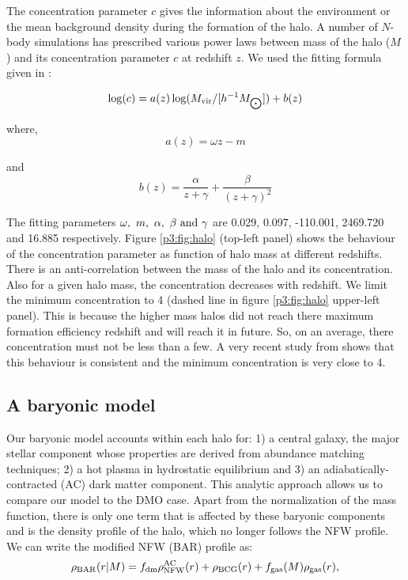 \documentclass[
  11pt,
  twoside,
  openright,
  titlepage,
  headings=optiontoheadandtoc
]{scrbook}
\begin{document}
The concentration parameter $c$ gives the information about the environment or the mean background density during the formation of the halo. A number of $N$-body simulations \citep{1997ApJ...490..493N, 1999MNRAS.310..527A, 2000ApJ...535...30J, 2001MNRAS.321..559B, 2001ApJ...554..114E, 2003ApJ...597L...9Z, 2007MNRAS.381.1450N, 2007MNRAS.378...55M, 2008MNRAS.390L..64D, 2008MNRAS.387..536G, 2014MNRAS.441.3359D} has prescribed various power laws between mass of the halo ($M$) and its concentration parameter $c$ at redshift $z$. We used the fitting formula given in \citep{2011MNRAS.411..584M}:

\begin{equation}
	\log(c) = a(z)\log(M_{\rm vir}/[h^{-1} M_{\bigodot}]) + b(z)
\end{equation}

where,
\begin{equation}
	a(z) = \omega z - m
\end{equation}

and
\begin{equation}
	b(z) = \dfrac{\alpha}{z+\gamma} + \dfrac{\beta}{(z+\gamma)^2}
\end{equation}

The fitting parameters $\omega,\ m,\ \alpha,\ \beta\ {\rm and}\ \gamma$ are 0.029, 0.097, -110.001, 2469.720 and 16.885 respectively.
Figure \ref{p3:fig:halo} (top-left panel) shows the behaviour of the concentration parameter as function of halo mass at different redshifts. There is an anti-correlation between the mass of the halo and its concentration. Also for a given halo mass, the concentration decreases with redshift. We limit the minimum concentration to 4 (dashed line in figure \ref{p3:fig:halo} upper-left panel). This is because the higher mass halos did not reach there maximum formation efficiency redshift and will reach it in future. So, on an average, there concentration must not be less than a few. A very recent study from \cite{2014MNRAS.441.3359D} shows that this behaviour is consistent and the minimum concentration is very close to 4. 


\subsection{A baryonic model}\label{p3:sec:baryonicmodel}
Our baryonic model accounts within each halo for: 1) a central galaxy, the major stellar component whose properties are derived from abundance matching techniques; 2) a hot plasma in hydrostatic equilibrium and 3) an adiabatically-contracted (AC) dark matter component. This analytic approach allows us to compare our model to the DMO case. Apart from the normalization of the mass function, there is only one term that is affected by these baryonic components and is the density profile of the halo, which no longer follows the NFW profile. We can write the modified NFW (BAR) profile as:
\begin{equation}
	\rho_{\rm BAR}(r|M) = f_{\rm dm}\rho_{\rm NFW}^{\rm AC}(r) + \rho_{\rm BCG}(r) + f_{\rm gas}(M)\rho_{\rm gas}(r),
\end{equation}
\end{document}
